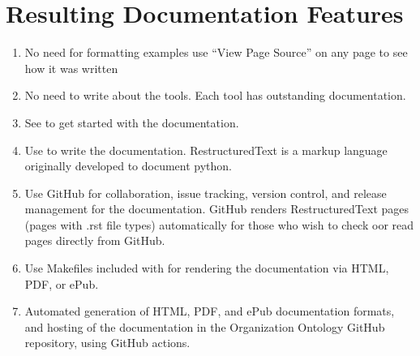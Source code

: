 \documentclass[letterpaper,10pt,english]{sphinxmanual}
\begin{document}
\section{Resulting Documentation Features}
\label{\detokenize{documentation-authors:resulting-documentation-features}}\begin{enumerate}
%
\item {} 
\sphinxAtStartPar
No need for formatting examples \textendash{} use “View Page Source” on any page to see how it
was written

\item {} 
\sphinxAtStartPar
No need to write about the tools.  Each tool has outstanding documentation.

\item {} 
\sphinxAtStartPar
See
to get
started with the documentation.

\item {} 
\sphinxAtStartPar
Use  to
write the documentation.  RestructuredText is a mark\sphinxhyphen{}up language originally developed
to document python.

\item {} 
\sphinxAtStartPar
Use GitHub for collaboration, issue tracking, version control, and release
management for
the documentation.  GitHub renders RestructuredText pages (pages with .rst
file types) automatically for those who wish to check oor read pages directly from
GitHub.

\item {} 
\sphinxAtStartPar
Use Makefiles included with  for rendering
the documentation via HTML, PDF, or ePub.

\item {} 
\sphinxAtStartPar
Automated generation of HTML, PDF, and ePub documentation formats, and hosting of
the documentation in the Organization Ontology GitHub repository, using GitHub
actions.

\end{enumerate}
\end{document}
